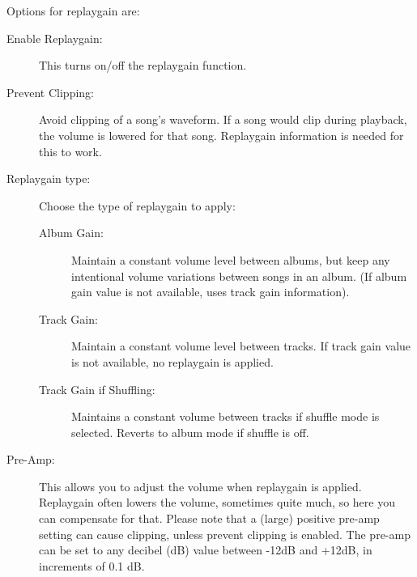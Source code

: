 \begin{description}
{{        Options for replaygain are:
        \begin{description}
          \item[Enable Replaygain: ]This turns on/off the replaygain function.
          \item[Prevent Clipping: ]Avoid clipping of a song's waveform. If a song would clip during 
            playback, the volume is lowered for that song. Replaygain information is needed for this to work.
          \item[Replaygain type: ]Choose the type of replaygain to apply:
            \begin{description}
              \item[Album Gain: ]Maintain a constant volume level between albums, but keep any intentional 
                volume variations between songs in an album. (If album gain value is not available, uses track 
                gain information).
              \item[Track Gain: ]Maintain a constant volume level between tracks. If track gain value is not 
                available, no replaygain is applied.
              \item[Track Gain if Shuffling: ]Maintains a constant volume between tracks if shuffle mode is 
                selected. Reverts to album mode if shuffle is off.
            \end{description}
          \item[Pre-Amp: ]This allows you to adjust the volume when replaygain is applied. Replaygain often 
            lowers the volume, sometimes quite much, so here you can compensate for that. Please note that a 
            (large) positive pre-amp setting can cause clipping, unless prevent clipping is enabled.  The 
            pre-amp can be set to any decibel (dB) value between -12dB and +12dB, in increments of 0.1 dB.
        \end{description}
        }
    }
 \end{description}
